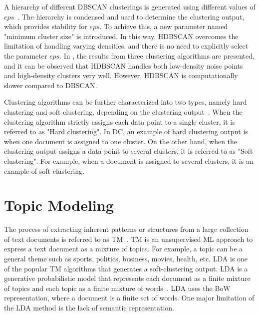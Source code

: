 \begin{description}
	
	
	A hierarchy of different \ac{DBSCAN} clusterings is generated using different values of $eps$~\cite{mcinnes2017accelerated}. The hierarchy is condensed and used to determine the clustering output, which provides stability for $eps$. To achieve this, a new parameter named "minimum cluster size" is introduced. In this way, \ac{HDBSCAN} overcomes the limitation of handling varying densities, and there is no need to explicitly select the parameter $eps$. In , the results from three clustering algorithms are presented, and it can be observed that \ac{HDBSCAN} handles both low-density noise points and high-density clusters very well. However, \ac{HDBSCAN} is computationally slower compared to \ac{DBSCAN}.

	
	

	
\end{description} 


Clustering algorithms can be further characterized into two types, namely hard clustering and soft clustering, depending on the clustering output~\cite{de2012document}. When the clustering algorithm strictly assigns each data point to a single cluster, it is referred to as "Hard clustering". In \ac{DC}, an example of hard clustering output is when one document is assigned to one cluster. On the other hand, when the clustering output assigns a data point to several clusters, it is referred to as "Soft clustering". For example, when a document is assigned to several clusters, it is an example of soft clustering.


\section{Topic Modeling}

The process of extracting inherent patterns or structures from a large collection of text documents is referred to as \ac{TM}~\cite{angelov2020top2vec}. \ac{TM} is an unsupervised \ac{ML} approach to express a text document as a mixture of topics. For example, a topic can be a general theme such as sports, politics, business, movies, health, etc. \ac{LDA} is one of the popular \ac{TM} algorithms that generates a soft-clustering output. \ac{LDA} is a generative probabilistic model that represents each document as a finite mixture of topics and each topic as a finite mixture of words~\cite{blei2003latent, angelov2020top2vec}. \ac{LDA} uses the \ac{BoW} representation, where a document is a finite set of words. One major limitation of the \ac{LDA} method is the lack of semantic representation.

